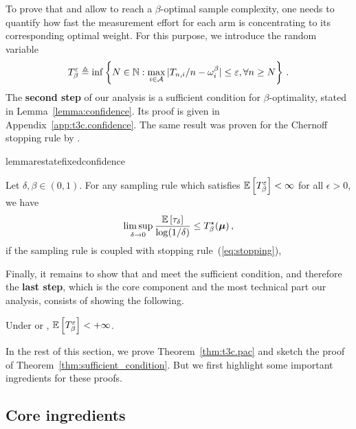 To prove that \TTTS and \TCC allow to reach a $\beta$-optimal sample complexity, one needs to quantify how fast the measurement effort for each arm is concentrating to its corresponding optimal weight. For this purpose,  we introduce the random variable
\[
    T_{\beta}^\varepsilon \triangleq \inf \left\{ N\in{\mathbb N}: \max_{i\in\mathcal{A}} \vert T_{n,i}/n-\omega_i^\beta \vert \leq \varepsilon, \forall n \geq N \right\}\,.
\]
The \textbf{second step} of our analysis is a sufficient condition for $\beta$-optimality, stated in Lemma~\ref{lemma:confidence}. Its proof is given in Appendix~\ref{app:t3c.confidence}. The same result was proven for the Chernoff stopping rule by \cite{qin2017ttei}.

\begin{restatable}{lemma}{restatefixedconfidence}\label{lemma:confidence}
\begin{leftbar}[lemmabar]
    Let $\delta,\beta\in (0,1)$. For any sampling rule which satisfies $\mathbb{E}\left[T_{\beta}^\varepsilon\right] < \infty$ for all $\epsilon > 0$, we have
    \[
        \limsup_{\delta\rightarrow{0}} \frac{\mathbb{E}\left[\tau_{\delta}\right]}{\log(1/\delta)} \leq T_{\beta}^\star({\boldsymbol \mu})\,,
    \]
    if the sampling rule is coupled with stopping rule~(\ref{eq:stopping}), 
\end{leftbar}
\end{restatable}

Finally, it remains to show that \TTTS and \TCC meet the sufficient condition, and therefore the \textbf{last step}, which is the core component and the most technical part our analysis, consists of showing the following.

\begin{theorem}\label{thm:sufficient_condition}
\begin{leftbar}[theorembar]
    Under \TTTS or \TCC, $\mathbb{E}\left[T_{\beta}^\varepsilon\right] < +\infty$.
\end{leftbar}
\end{theorem}


In the rest of this section, we prove Theorem~\ref{thm:t3c.pac} and sketch the proof of Theorem~\ref{thm:sufficient_condition}. But we first highlight some important ingredients for these proofs.

\subsection{Core ingredients}

